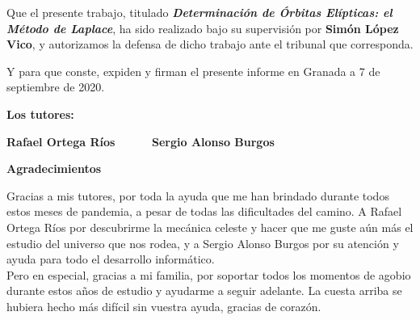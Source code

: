 Que el presente trabajo, titulado \textit{\textbf{Determinación de Órbitas Elípticas: el Método de Laplace}}, ha sido realizado bajo su supervisión por \textbf{Simón López Vico}, y autorizamos la defensa de dicho trabajo ante el tribunal que corresponda.

\vspace{0.5cm}

Y para que conste, expiden y firman el presente informe en Granada a 7 de septiembre de 2020.

\vspace{1cm}

\textbf{Los tutores:}

\vspace{5cm}

\noindent \textbf{Rafael Ortega Ríos \ \ \ \ \ Sergio Alonso Burgos}


\clearpage{\thispagestyle{empty}\cleardoublepage}

\thispagestyle{empty}


\begin{Huge}
\textbf{Agradecimientos}
\end{Huge}
\thispagestyle{empty}

\vspace{1cm}

Gracias a mis tutores, por toda la ayuda que me han brindado durante todos estos meses de pandemia, a pesar de todas las dificultades del camino. A Rafael Ortega Ríos por descubrirme la mecánica celeste y hacer que me guste aún más el estudio del universo que nos rodea, y a Sergio Alonso Burgos por su atención y ayuda para todo el desarrollo informático.\\

Pero en especial, gracias a mi familia, por soportar todos los momentos de agobio durante estos años de estudio y ayudarme a seguir adelante. La cuesta arriba se hubiera hecho más difícil sin vuestra ayuda, gracias de corazón.

\clearpage{\thispagestyle{empty}\cleardoublepage}

\thispagestyle{empty}

